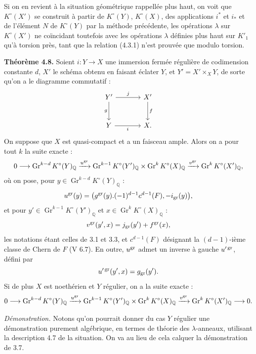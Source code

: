Si on en revient à la situation géométrique rappellée plus haut, on voit que \(K^\circ(X')\) se construit à partir de \(K^\circ(Y)\), \(K^\circ(X)\), des applications \(i^*\) et \(i_*\) et de l'élément \(N\) de \(K^\circ(Y)\) par la méthode précédente, les opérations \(\lambda\) sur \(K^\circ(X')\) ne coïncidant toutefois avec les opérations \(\lambda\) définies plus haut sur \(K'_1\) qu'à torsion près, tant que la relation (4.3.1) n'est prouvée que modulo torsion.

\textbf{Théorème 4.8.} Soient \(i:Y\to X\) une immersion fermée régulière de codimension constante \(d\), \(X'\) le schéma obtenu en faisant éclater \(Y\), et \(Y'=X'\times_XY\), de sorte qu'on a le diagramme commutatif :
\[
\begin{tikzcd}[column sep=large,row sep=large]
Y' \arrow[r,"j"] \arrow[d,"g"'] & X' \arrow[d,"f"]\\
Y \arrow[r,"i"'] & X.
\end{tikzcd}
\]
On suppose que \(X\) est quasi-compact et a un faisceau ample. Alors on a pour tout \(k\) la suite
exacte :
\[
0\longrightarrow
\operatorname{Gr}^{k-d}K^\circ(Y)_{\mathbb Q}
\xrightarrow{u^{\operatorname{gr}}}
\operatorname{Gr}^{k-1}K^\circ(Y')_{\mathbb Q}
\times
\operatorname{Gr}^{k}K^\circ(X)_{\mathbb Q}
\xrightarrow{v^{\operatorname{gr}}}
\operatorname{Gr}^{k}K^\circ(X')_{\mathbb Q},
\]
où on pose, pour \(y\in \operatorname{Gr}^{k-d}K^\circ(Y)_{\mathbb Q}\) :
\[
  u^{\operatorname{gr}}(y)=
  \bigl(g^{\operatorname{gr}}(y).(-1)^{d-1}c^{d-1}(F),-i_{\operatorname{gr}}(y)\bigr),
\]
et pour \(y'\in \operatorname{Gr}^{k-1}K^\circ(Y')_{\mathbb Q}\) et \(x\in \operatorname{Gr}^{k}K^\circ(X)_{\mathbb Q}\) :
\[
  v^{\operatorname{gr}}(y',x)=j_{\operatorname{gr}}(y')+f^{\operatorname{gr}}(x),
\]
les notations étant celles de 3.1 et 3.3, et \(c^{d-1}(F)\) désignant la \((d-1)\)-ième classe de Chern de \(F\) (V 6.7). En outre, \(u^{\operatorname{gr}}\) admet un inverse à gauche \(u'^{\operatorname{gr}}\), défini par
\[
  u'^{\operatorname{gr}}(y',x)=g_{\operatorname{gr}}(y').
\]
Si de plus \(X\) est noethérien et \(Y\) régulier, on a la suite exacte :
\[
0\longrightarrow
\operatorname{Gr}^{k-d}K^\circ(Y)_{\mathbb Q}
\xrightarrow{u^{\operatorname{gr}}}
\operatorname{Gr}^{k-1}K^\circ(Y')_{\mathbb Q}
\times
\operatorname{Gr}^{k}K^\circ(X)_{\mathbb Q}
\xrightarrow{v^{\operatorname{gr}}}
\operatorname{Gr}^{k}K^\circ(X')_{\mathbb Q}
\longrightarrow0.
\]

\emph{Démonstration.} Notons qu'on pourrait donner du cas \(Y\) régulier une démonstration purement algébrique, en termes de théorie des \(\lambda\)-anneaux, utilisant la description 4.7 de la situation. On va au lieu de cela calquer la démonstration de 3.7.

